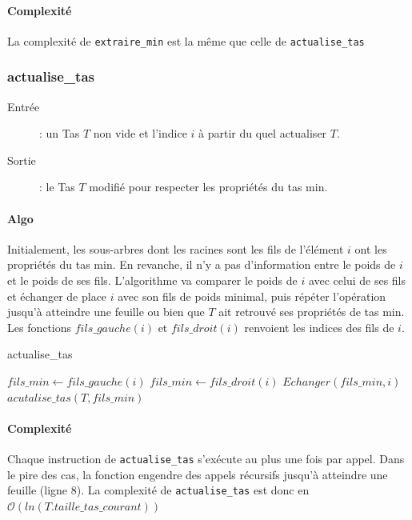 \documentclass[a4paper,11pt]{article}
\begin{document}
\paragraph*{Complexité}
La complexité de \texttt{extraire\_min} est la même que celle de \texttt{actualise\_tas}
\subsubsection*{actualise\_tas}
\begin{description}
\item[Entrée] : un \textsf{Tas} $T$ non vide et l'indice $i$ à partir du quel actualiser $T$.
\item[Sortie] : le \textsf{Tas} $T$ modifié pour respecter les propriétés du tas min.
\end{description}
\paragraph*{Algo}
Initialement, les sous-arbres dont les racines sont les fils de l'élément $i$ ont les propriétés du tas min. En revanche, il n'y a pas d'information entre le poids de $i$ et le poids de ses fils. L'algorithme va comparer le poids de $i$ avec celui de ses fils et échanger de place $i$ avec son fils de poids minimal, puis répéter l'opération jusqu'à atteindre une feuille ou bien que $T$ ait retrouvé ses propriétés de tas min.\\
Les fonctions $fils\_gauche(i)$ et $fils\_droit(i)$ renvoient les indices des fils de $i$.
\begin{algorithm}
\caption{actualise\_tas}
\begin{algorithmic}[1]
\STATE $fils\_min \leftarrow fils\_gauche(i)$
\ELSE
\STATE $fils\_min \leftarrow fils\_droit(i)$
\ENDIF
{}
\STATE $Echanger(fils\_min, i)$
\STATE $acutalise\_tas(T, fils\_min)$
\ENDIF
\ENDIF
\end{algorithmic}
\end{algorithm}
\paragraph*{Complexité}
Chaque instruction de \texttt{actualise\_tas} s'exécute au plus une fois par appel. Dans le pire des cas, la fonction engendre des appels récursifs jusqu'à atteindre une feuille (ligne 8). La complexité de \texttt{actualise\_tas} est donc en $\mathcal{O}(ln(T.taille\_tas\_courant))$
\end{document}
